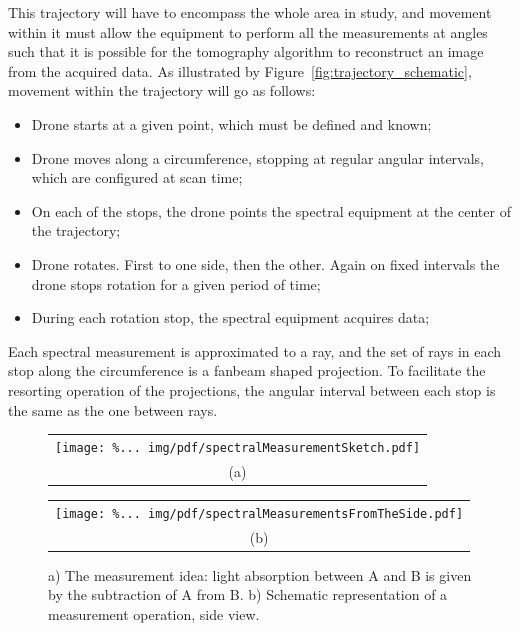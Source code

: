 This trajectory will have to encompass the whole area in study, and
movement within it must allow the equipment to perform all the
measurements at angles such that it is possible for the tomography
algorithm to reconstruct an image from the acquired data. As illustrated
by Figure~\ref{fig:trajectory_schematic}, movement within the trajectory
will go as follows:
\begin{itemize}
    \item Drone starts at a given point, which must be defined and
        known;
    \item Drone moves along a circumference, stopping at regular angular
        intervals, which are configured at scan time;
    \item On each of the stops, the drone points the spectral equipment
        at the center of the trajectory;
    \item Drone rotates. First to one side, then the other. Again on
        fixed intervals the drone stops rotation for a given period of
        time;
    \item During each rotation stop, the spectral equipment acquires
        data;
\end{itemize}

Each spectral measurement is approximated to a ray, and the set of rays
in each stop along the circumference is a fanbeam shaped projection. To
facilitate the resorting operation of the projections, the angular
interval between each stop is the same as the one between rays.

\begin{figure}
    \centering
    \begin{tabular}[b]{c}
        \texttt{[image: \%...
            img/pdf/spectralMeasurementSketch.pdf]}\\
        \small (a)
    \end{tabular}
    \hfill
    \begin{tabular}[b]{c}
        \texttt{[image: \%...
            img/pdf/spectralMeasurementsFromTheSide.pdf]}\\
        \small (b)
    \end{tabular}
    \caption{a) The measurement idea: light absorption between A and B
    is given by the subtraction of A from B. b) Schematic representation
    of a measurement operation, side view.}
    \label{fig:measurement}
\end{figure}





